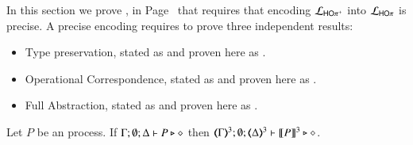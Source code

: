 

In this section we prove , in Page~\pageref{f:enc:hoppptohop}
that requires that encoding
$\mathcal{L}_{\mathsf{HO\pi^{+}}}$ into $\mathcal{L}_{\mathsf{HO}\pi}$ is precise.
A precise encoding requires to prove three independent results:
\begin{itemize}
	\item	Type preservation, stated as 
	and proven here as .
	\item	Operational Correspondence, stated as  and proven here as .
	\item	Full Abstraction, stated as 
	and proven here as .
\end{itemize}

\begin{proposition}\myrm
	\label{app:prop:typepres_HOpp_to_HOp}
	Let $P$ be an \HOpp process.
	If $\Gamma; \emptyset; \Delta \vdash P \triangleright \diamond$ then 
	$\tmap{\Gamma}{3}; \emptyset; \tmap{\Delta}{3} \proves \pmap{P}{3} \hastype \Proc$. 
\end{proposition}

